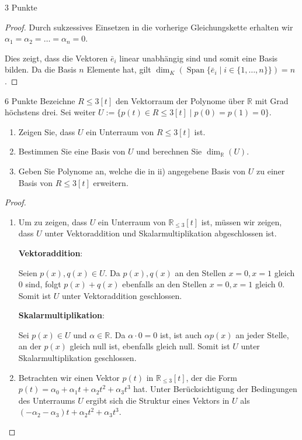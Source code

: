 \documentclass{problemset}
\begin{document}
\begin{problem}{3 Punkte}
\begin{proof}
	Durch sukzessives Einsetzen in die vorherige Gleichungskette erhalten wir $\alpha_1 = \alpha_2 = \ldots = \alpha_n = 0$.

	Dies zeigt, dass die Vektoren $\bar{e}_i$ linear unabhängig sind und somit eine Basis bilden. Da die Basis $n$ Elemente hat, gilt $\dim_K(\operatorname{Span}\{\bar{e}_i \mid i \in \{1, \ldots, n\}\}) = n$.
\end{proof}
\end{problem}

\begin{problem}{6 Punkte}
Bezeichne $R\leq 3[t]$ den Vektorraum der Polynome über $\mathbb{R}$ mit Grad höchstens drei. Sei weiter $U := \{p(t) \in R\leq 3[t] \mid p(0) = p(1) = 0\}$.
\begin{enumerate}
	\item Zeigen Sie, dass $U$ ein Unterraum von $R\leq 3[t]$ ist.
	\item Bestimmen Sie eine Basis von $U$ und berechnen Sie $\dim_{\mathbb{R}}(U)$.
	\item Geben Sie Polynome an, welche die in ii) angegebene Basis von $U$ zu einer Basis von $R\leq 3[t]$ erweitern.
\end{enumerate}
\begin{proof}
	$ $

	\begin{enumerate}
		\item Um zu zeigen, dass $U$ ein Unterraum von $\mathbb{R}_{\leq 3}[t]$ ist, müssen wir zeigen, dass $U$ unter Vektoraddition und Skalarmultiplikation abgeschlossen ist.

		      \textbf{Vektoraddition}:

		      Seien $p(x), q(x) \in U$. Da $p(x), q(x)$ an den Stellen $x = 0, x = 1$ gleich 0 sind, folgt
		      $p(x) + q(x)$ ebenfalls an den Stellen $x = 0, x = 1$ gleich 0. Somit ist $U$ unter Vektoraddition geschlossen. \checkmark

		      \textbf{Skalarmultiplikation}:

		      Sei $p(x) \in U$ und $\alpha \in \mathbb{R}$. Da $\alpha \cdot 0 = 0$ ist, ist auch $\alpha p(x)$ an jeder Stelle, an der $p(x)$ gleich null ist, ebenfalls gleich null.
		      Somit ist $U$ unter Skalarmultiplikation geschlossen. \checkmark
		\item Betrachten wir einen Vektor $p(t)$ in $\mathbb{R}_{\leq 3}[t]$, der die Form $p(t) = \alpha_0 + \alpha_1t + \alpha_2t^2 + \alpha_3t^3$ hat.
		      Unter Berücksichtigung der Bedingungen des Unterraums $U$ ergibt sich die Struktur eines Vektors in $U$ als $(-\alpha_2 - \alpha_3)t + \alpha_2t^2 + \alpha_3t^3$.


\end{enumerate}
\end{proof}
\end{problem}
\end{document}
